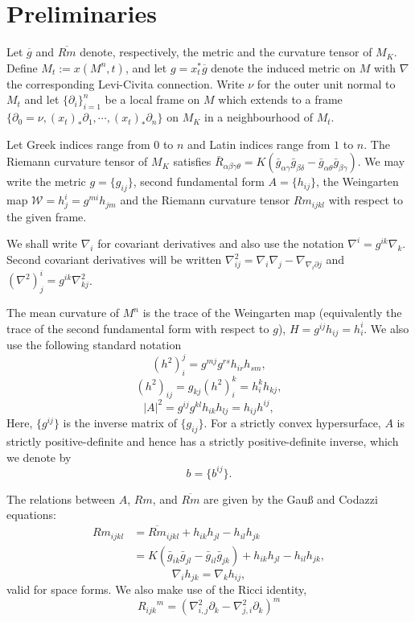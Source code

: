 \documentclass{amsart}
\begin{document}
\section{Preliminaries}

Let $\overline{g}$ and $\overline{Rm}$ denote, respectively, the metric and the curvature tensor of $M_K$. Define \(M_t := x(M^n,t)\), and let \(g = x_t^{\ast} \overline{g}\) denote the induced metric on \(M\) with $\nabla$ the corresponding Levi-Civita connection. Write $\nu$ for the outer unit normal to $M_t$ and let \(\{\partial_i\}_{i=1}^n\) be a local frame on \(M\) which extends to a frame \(\{\partial_0 = \nu, (x_t)_{\ast} \partial_1, \cdots, (x_t)_{\ast} \partial_n\}\) on \(M_K\) in a neighbourhood of \(M_t\). 

Let Greek indices range from \(0\) to \(n\) and Latin indices range from \(1\) to \(n\). The Riemann curvature tensor of \(M_K\) satisfies \(\bar{R}_{\alpha\beta\gamma\theta} = K(\bar{g}_{\alpha\gamma}\bar{g}_{\beta\delta} - \bar{g}_{\alpha\theta}\bar{g}_{\beta\gamma})\). We may write the metric $g = \{g_{ij}\}$, second fundamental form $A = \{h_{ij}\}$, the Weingarten map $\mathcal{W} = h^i_j = g^{mi} h_{jm}$ and the Riemann curvature tensor $Rm_{ijkl}$ with respect to the given frame. 

We shall write \(\nabla_i\) for covariant derivatives and also use the notation \(\nabla^i = g^{ik} \nabla_k\). Second covariant derivatives will be written \(\nabla^2_{ij} = \nabla_i \nabla_j - \nabla_{\nabla_i \partial j}\) and \((\nabla^2)^i_j = g^{ik} \nabla^2_{kj}\). 

The mean curvature of $M^n$ is the trace of the Weingarten map (equivalently the trace of the second fundamental form with respect to $g$), $H = g^{ij}h_{ij} = h^i_i$. We also use the following standard notation
\[
(h^2)_i^j = g^{mj}g^{rs}h_{ir}h_{sm},
\]
\[
(h^2)_{ij} = g_{kj} (h^2)_i^k = h^k_i h_{kj},
\]
\[
|A|^2 = g^{ij}g^{kl}h_{ik}h_{lj} = h_{ij}h^{ij},
\]
Here, $\{g^{ij}\}$ is the inverse matrix of $\{g_{ij}\}.$ For a strictly convex hypersurface, \(A\) is strictly positive-definite and hence has a strictly positive-definite inverse, which we denote by 
\[
b = \{b^{ij}\}.
\]

The relations between $A$, $Rm$, and $\overline{Rm}$ are given by the Gau{\ss} and Codazzi equations:
\[
\begin{split}
Rm_{ijkl} &= \overline{Rm}_{ijkl} + h_{ik}h_{jl} - h_{il}h_{jk} \\
&= K(\bar{g}_{ik}\bar{g}_{jl} - \bar{g}_{il}\bar{g}_{jk}) + h_{ik}h_{jl} - h_{il}h_{jk},
\end{split}
\]
\[
\nabla_i h_{jk} = \nabla_k h_{ij},
\]
valid for space forms. We also make use of the Ricci identity,
\[
{R_{ijk}}^m  = \left(\nabla^2_{i, j} \partial_k - \nabla^2_{j,i} \partial_k\right)^m
\]
\end{document}
